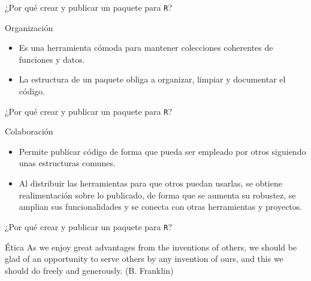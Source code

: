 \documentclass[xcolor={usenames,svgnames,dvipsnames}]{beamer}
\begin{document}
\begin{frame}[label={sec:orgeb5d3e7},fragile]{¿Por qué crear y publicar un paquete para \texttt{R}?}
 \begin{block}{Organización}
\begin{itemize}
\item Es una herramienta cómoda para mantener \alert{colecciones coherentes de funciones y datos}.
\item La estructura de un paquete \alert{obliga a organizar, limpiar y documentar} el código.
\end{itemize}
\end{block}
\end{frame}

\begin{frame}[label={sec:org6b8e6c9},fragile]{¿Por qué crear y publicar un paquete para \texttt{R}?}
 \begin{block}{Colaboración}
\begin{itemize}
\item Permite publicar código de forma que pueda ser \alert{empleado por otros} siguiendo unas \alert{estructuras comunes}.
\item Al distribuir las herramientas para que otros puedan usarlas, se obtiene \alert{realimentación sobre lo publicado}, de forma que se aumenta su \alert{robustez}, se \alert{amplian sus funcionalidades} y se \alert{conecta con otras herramientas} y proyectos.
\end{itemize}
\end{block}
\end{frame}

\begin{frame}[label={sec:orgbb06edc},fragile]{¿Por qué crear y publicar un paquete para \texttt{R}?}
 \begin{block}{Ética}
\guillemotleft{}As we enjoy great advantages from the inventions of others, we should be glad of an opportunity to serve others by any invention of ours, and this we should do freely and generously.\guillemotright{} (B. Franklin)
\end{block}
\end{frame}
\end{document}
